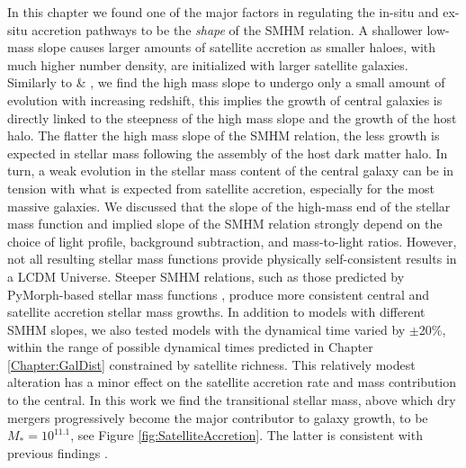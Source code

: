 In this chapter we found one of the major factors in regulating the in-situ and ex-situ accretion pathways to be the \textit{shape} of the SMHM relation. A shallower low-mass slope causes larger amounts of satellite accretion as smaller haloes, with much higher number density, are initialized with larger satellite galaxies. Similarly to \citet{Shankar2006NewFormation} \& \citet{Moster2018Emerge10}, we find the high mass slope to undergo only a small amount of evolution with increasing redshift, this implies the growth of central galaxies is directly linked to the steepness of the high mass slope and the growth of the host halo. The flatter the high mass slope of the SMHM relation, the less growth is expected in stellar mass following the assembly of the host dark matter halo. In turn, a weak evolution in the stellar mass content of the central galaxy can be in tension with what is expected from satellite accretion, especially for the most massive galaxies. We discussed that the slope of the high-mass end of the stellar mass function and implied slope of the SMHM relation strongly depend on the choice of light profile, background subtraction, and mass-to-light ratios. However, not all resulting stellar mass functions provide physically self-consistent results in a LCDM Universe. Steeper SMHM relations, such as those predicted by PyMorph-based stellar mass functions \citep{Bernardi2013TheProfile}, produce more consistent central and satellite accretion stellar mass growths. In addition to models with different SMHM slopes, we also tested models with the dynamical time varied by $\pm$20$\%$, within the range of possible dynamical times predicted in Chapter \ref{Chapter:GalDist} constrained by satellite richness. This relatively modest alteration has a minor effect on the satellite accretion rate and mass contribution to the central. In this work we find the transitional stellar mass, above which dry mergers progressively become the major contributor to galaxy growth, to be $M_{*} = 10^{11.1}$, see Figure \ref{fig:SatelliteAccretion}. The latter is consistent with previous findings \citep[e.g.,][]{Bernardi2011EvidenceRelations, Cappellari2013EffectEvolution, Shankar2013SizeUniverse}.


